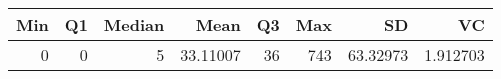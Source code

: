 
\begin{tabular}[t]{rrrrrrrr}
\toprule
Min & Q1 & Median & Mean & Q3 & Max & SD & VC\\
\midrule
0 & 0 & 5 & 33.11007 & 36 & 743 & 63.32973 & 1.912703\\
\bottomrule
\end{tabular}